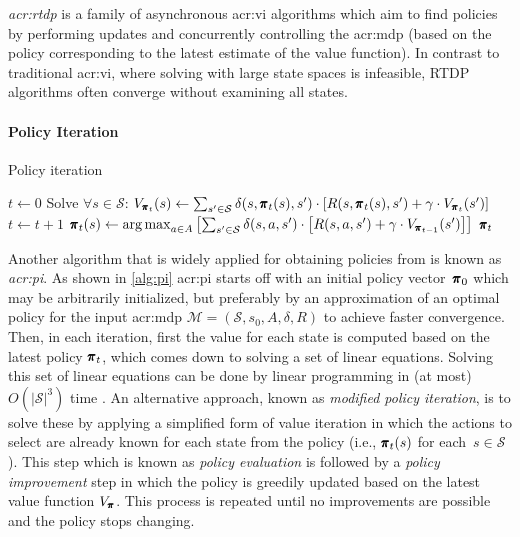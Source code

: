 \textit{\acrfull{acr:rtdp}} \cite{barto1995learning} is a family of asynchronous \acrshort{acr:vi} algorithms which aim to find policies by performing updates and concurrently controlling the \acrshort{acr:mdp} (based on the policy corresponding to the latest estimate of the value function).
In contrast to traditional \acrshort{acr:vi}, where solving  with large state spaces is infeasible, RTDP algorithms often converge without examining all states.


\paragraph{Policy Iteration}
\label{sec:policy-iteration}

\begin{algorithm}[!t]
	\caption{Policy iteration}
	\label{alg:pi}
	\begin{algorithmic}[1]
		\Require{MDP $\mathcal{M} = (\mathcal{S}, s_0, A, \delta, R)$, Discount factor $\gamma \in [0, 1)$}
		\State $t \gets 0$
		\Repeat
		\State Solve $\forall s \in \mathcal{S}$: $V_{\pmb{\pi}_{t}}(s) \gets \sum_{s' \in \mathcal{S}} \delta(s, \pmb{\pi}_t(s), s') \cdot \left[R(s, \pmb{\pi}_t(s), s') + \gamma \cdot V_{\pmb{\pi}_{t}}(s')\right]$
		\State $t \gets t + 1$
		\State $\pmb{\pi}_t(s) \gets \operatorname*{arg\,max}_{a \in A} \left[\sum_{s' \in \mathcal{S}} \delta(s, a, s') \cdot \left[R(s, a, s') + \gamma \cdot V_{\pmb{\pi}_{t - 1}}(s')\right]\right]$
		\EndFor
		\State\Return $\pmb{\pi}_t$
	\end{algorithmic}
\end{algorithm}

Another algorithm that is widely applied for obtaining policies from  is known as \textit{\acrfull{acr:pi}}. As shown in \autoref{alg:pi} \acrshort{acr:pi} starts off with an initial policy vector~$\pmb{\pi}_0$ which may be arbitrarily initialized, but preferably by an approximation of an optimal policy for the input \acrshort{acr:mdp} $\mathcal{M} = (\mathcal{S}, s_0, A, \delta, R)$ to achieve faster convergence.
Then, in each iteration, first the value for each state is computed based on the latest policy $\pmb{\pi}_t$, which comes down to solving a set of linear equations.
Solving this set of linear equations can be done by linear programming in (at most) $O(\lvert\mathcal{S}\rvert^3)$ time \cite{littman1995complexity}. 
An alternative approach, known as \textit{modified policy iteration}, is to solve these by applying a simplified form of value iteration in which the actions to select are already known for each state from the policy (i.e., $\pmb{\pi}_t(s)$ for each~$s \in \mathcal{S}$).
This step which is known as \textit{policy evaluation} is followed by a \textit{policy improvement} step in which the policy is greedily updated based on the latest value function $V_{\pmb{\pi}}$.
This process is repeated until no improvements are possible and the policy stops changing.

